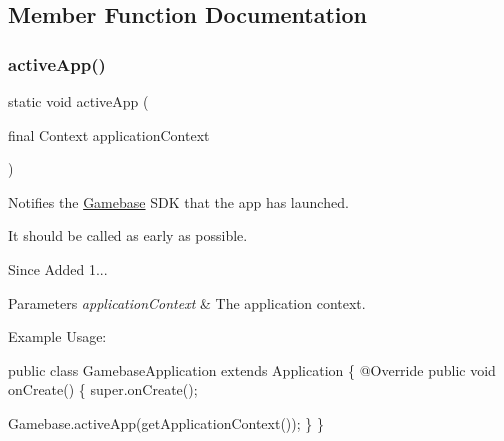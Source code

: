 \subsection{Member Function Documentation}
\mbox{\label{classcom_1_1toast_1_1android_1_1gamebase_1_1_gamebase_a07fe4c62c585e8af9f924935e813ff12}} 
\subsubsection{\texorpdfstring{active\+App()}{activeApp()}}
{\footnotesize\ttfamily static void active\+App (\begin{DoxyParamCaption}\item[{final Context}]{application\+Context }\end{DoxyParamCaption})\hspace{0.3cm}{\ttfamily [static]}}



Notifies the \hyperlink{classcom_1_1toast_1_1android_1_1gamebase_1_1_gamebase}{Gamebase} S\+DK that the app has launched. 

It should be called as early as possible.

\begin{DoxySince}{Since}
Added 1... 
\end{DoxySince}

\begin{DoxyParams}{Parameters}
{\em application\+Context} & The application context.\\
\hline
\end{DoxyParams}
Example Usage\+: 
\begin{DoxyCode}
\textcolor{keyword}{public} \textcolor{keyword}{class }GamebaseApplication \textcolor{keyword}{extends} Application \{
    @Override
    \textcolor{keyword}{public} \textcolor{keywordtype}{void} onCreate() \{
        super.onCreate();

        Gamebase.activeApp(getApplicationContext());
    \}
\}
\end{DoxyCode}
 \mbox{\label{classcom_1_1toast_1_1android_1_1gamebase_1_1_gamebase_a1e08fbd00c06712debae39f1e5592ec0}} 
